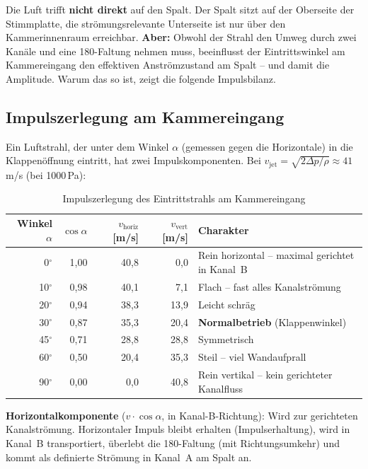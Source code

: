 \documentclass[11pt,a4paper]{article}
\begin{document}
\begin{warnbox}
Die Luft trifft \textbf{nicht direkt} auf den Spalt. Der Spalt sitzt auf der Oberseite der Stimmplatte, die strömungsrelevante Unterseite ist nur über den Kammerinnenraum erreichbar. \textbf{Aber:} Obwohl der Strahl den Umweg durch zwei Kanäle und eine 180\textdegree-Faltung nehmen muss, beeinflusst der Eintrittswinkel am Kammereingang den effektiven Anströmzustand am Spalt -- und damit die Amplitude. Warum das so ist, zeigt die folgende Impulsbilanz.
\end{warnbox}

\subsection{Impulszerlegung am Kammereingang}

Ein Luftstrahl, der unter dem Winkel $\alpha$ (gemessen gegen die Horizontale) in die Klappenöffnung eintritt, hat zwei Impulskomponenten. Bei $v_\text{jet} = \sqrt{2\Delta p/\rho} \approx 41$\,m/s (bei 1000\,Pa):

\begin{table}[H]
\centering\small
\begin{tabular}{r r r r l}
\toprule
\textbf{Winkel $\alpha$} & $\cos\alpha$ & $v_\text{horiz}$ [m/s] & $v_\text{vert}$ [m/s] & \textbf{Charakter} \\
\midrule
0${}^\circ$  & 1{,}00 & 40{,}8 & 0{,}0  & Rein horizontal -- maximal gerichtet in Kanal~B \\
10${}^\circ$ & 0{,}98 & 40{,}1 & 7{,}1  & Flach -- fast alles Kanalströmung \\
20${}^\circ$ & 0{,}94 & 38{,}3 & 13{,}9 & Leicht schräg \\
30${}^\circ$ & 0{,}87 & 35{,}3 & 20{,}4 & \textbf{Normalbetrieb} (Klappenwinkel) \\
45${}^\circ$ & 0{,}71 & 28{,}8 & 28{,}8 & Symmetrisch \\
60${}^\circ$ & 0{,}50 & 20{,}4 & 35{,}3 & Steil -- viel Wandaufprall \\
90${}^\circ$ & 0{,}00 & 0{,}0  & 40{,}8 & Rein vertikal -- kein gerichteter Kanalfluss \\
\bottomrule
\end{tabular}
\caption{Impulszerlegung des Eintrittstrahls am Kammereingang}
\end{table}

\textbf{Horizontalkomponente} ($v \cdot \cos\alpha$, in Kanal-B-Richtung): Wird zur gerichteten Kanalströmung. Horizontaler Impuls bleibt erhalten (Impulserhaltung), wird in Kanal~B transportiert, überlebt die 180\textdegree-Faltung (mit Richtungsumkehr) und kommt als definierte Strömung in Kanal~A am Spalt an.
\end{document}
